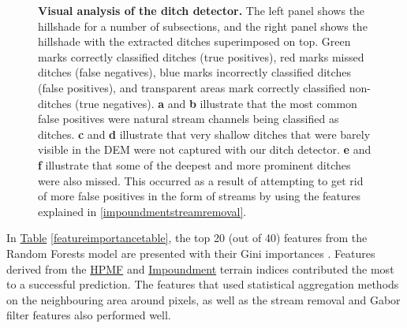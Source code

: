 \documentclass[11pt, review]{elsarticle} %
\begin{document}
\begin{figure} [!htb]
    \newline
    \caption{\textbf{Visual analysis of the ditch detector.} The left panel shows the hillshade for a number of subsections, and the right panel shows the hillshade with the extracted ditches superimposed on top. Green marks correctly classified ditches (true positives), red marks missed ditches (false negatives), blue marks incorrectly classified ditches (false positives), and transparent areas mark correctly classified non-ditches (true negatives). \textbf{a} and \textbf{b} illustrate that the most common false positives were natural stream channels being classified as ditches. \textbf{c} and \textbf{d} illustrate that very shallow ditches that were barely visible in the DEM were not captured with our ditch detector. \textbf{e} and \textbf{f} illustrate that some of the deepest and more prominent ditches were also missed. This occurred as a result of attempting to get rid of more false positives in the form of streams by using the features explained in \ref{impoundmentstreamremoval}.}
    \label{fig:resultsillustrations}
\end{figure}

\newpage
In \hyperref[featureimportancetable]{Table} \ref{featureimportancetable}, the top 20 (out of 40) features from the Random Forests model are presented with their Gini importances \citep{gini}. Features derived from the \hyperref[hpmf]{HPMF} and \hyperref[impoundment]{Impoundment} terrain indices contributed the most to a successful prediction. The features that used statistical aggregation methods on the neighbouring area around pixels, as well as the stream removal and Gabor filter features also performed well.
\end{document}
